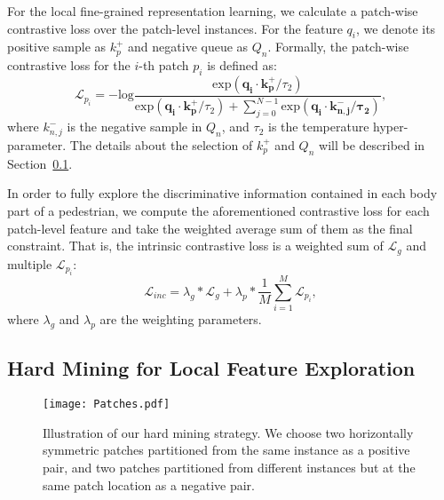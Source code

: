 \documentclass[10pt,twocolumn,letterpaper]{article}
\begin{document}
For the local fine-grained representation learning, we calculate a patch-wise contrastive loss over the patch-level instances. For the feature $q_i$, we denote its positive sample as $k^+_p$ and negative queue as $Q_n$. Formally, the patch-wise contrastive loss for the $i$-th patch $p_i$ is defined as:
\begin{equation}
\label{eqn:contrastive loss for patch i}
    \mathcal{L}_{p_i} = - \text{log}\frac{\text{exp}(\bm{q_i}\cdot\bm{k^+_p} / \tau_2)}{\text{exp}(\bm{q_i}\cdot\bm{k^+_p} / \tau_2) + \sum_{j=0}^{N-1} \text{exp}(\bm{q_i}\cdot\bm{k^-_{n,j}/\tau_2})},
\end{equation}
where $k^-_{n,j}$ is the negative sample in $Q_n$, and $\tau_2$ is the temperature hyper-parameter. The details about the selection of $k^+_p$ and $Q_n$ will be described in Section~\ref{section: hard mining}.

In order to fully explore the discriminative information contained in each body part of a pedestrian, we compute the aforementioned contrastive loss for each patch-level feature and take the weighted average sum of them as the final constraint. That is, the intrinsic contrastive loss is a weighted sum of $\mathcal{L}_{g}$ and multiple $\mathcal{L}_{p_i}$:
\begin{equation}
\label{identity-wise loss}
    \mathcal{L}_{inc} = \lambda_g * \mathcal{L}_{g} + \lambda_p * \frac{1}{M} \sum_{i=1}^{M} \mathcal{L}_{p_i},
\end{equation}
where $\lambda_g$ and $\lambda_p$ are the weighting parameters.




\subsection{Hard Mining for Local Feature Exploration}
\label{section: hard mining}

\begin{figure}[t]
    \centering
    \texttt{[image: Patches.pdf]}
    \setlength{\abovecaptionskip}{7pt}
    \vspace{-3mm}
    \caption{Illustration of our hard mining strategy. We choose two horizontally symmetric patches partitioned from the same instance as a positive pair, and two patches partitioned from different instances but at the same patch location as a negative pair.}
    \label{fig: hard mining}
    \vspace{-4mm}
\end{figure}
\end{document}
